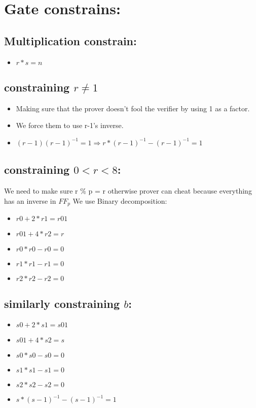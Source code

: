 \documentclass[11pt]{article}
\date{\today}
\title{}
\begin{document}
\section{Gate constrains:}
\label{sec:org3f61f29}

\subsection{Multiplication constrain:}
\label{sec:orgf218bc2}

\begin{itemize}
\item \(r * s = n\)
\end{itemize}

\subsection{constraining \(r \neq 1\)}
\label{sec:org6d50148}
\begin{itemize}
\item Making sure that the prover doesn't fool the verifier by using 1 as a factor.
\item We force them to use r-1's inverse.
\item \((r-1)(r-1)^{-1} = 1 \Rightarrow  r * (r-1)^{-1} - (r-1)^{-1} = 1\)
\end{itemize}

\subsection{constraining \(0< r < 8\):}
\label{sec:org5d55729}
We need to make sure r \% p = r
otherwise prover can cheat because everything has an inverse in \(FF_p\)
We use Binary decomposition:
\begin{itemize}
\item \(r0 + 2 * r1 = r01\)
\item \(r01 + 4 * r2 = r\)
\item \(r0 * r0 - r0 = 0\)
\item \(r1 * r1 - r1 = 0\)
\item \(r2 * r2 - r2 = 0\)
\end{itemize}

\subsection{similarly constraining \(b\):}
\label{sec:orga5c2f3e}

\begin{itemize}
\item \(s0 + 2 * s1 = s01\)
\item \(s01 + 4 * s2 = s\)
\item \(s0 * s0 - s0 = 0\)
\item \(s1 * s1 - s1 = 0\)
\item \(s2 * s2 - s2 = 0\)
\item \(s * (s-1)^{-1} - (s-1)^{-1} = 1\)
\end{itemize}
\end{document}
